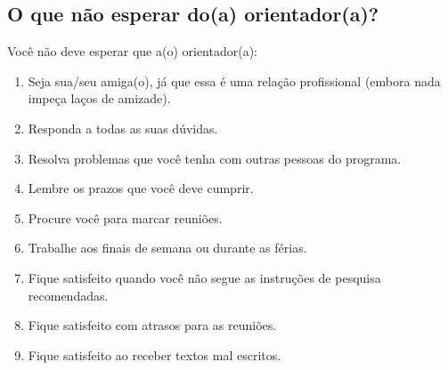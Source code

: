 \documentclass[twoside a4paper 12pt]{report}
\begin{document}
\subsection{O que não esperar do(a) orientador(a)?}
Você não deve esperar que a(o) orientador(a):
\begin{enumerate}
\item Seja sua/seu amiga(o), já que essa é uma relação profissional (embora nada impeça laços de amizade).
\item Responda a todas as suas dúvidas.
\item Resolva problemas que você tenha com outras pessoas do programa.
\item Lembre os prazos que você deve cumprir.
\item Procure você para marcar reuniões.
\item Trabalhe aos finais de semana ou durante as férias.
\item Fique satisfeito quando você não segue as instruções de pesquisa recomendadas.
\item Fique satisfeito com atrasos para as reuniões.
\item Fique satisfeito ao receber textos mal escritos.
\end{enumerate}
\end{document}
